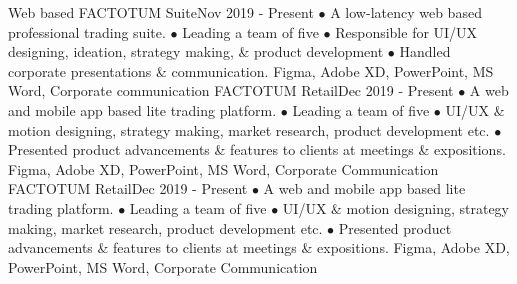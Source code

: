 %
%
%

\begin{projects}
  \project
    {Web based FACTOTUM Suite}{Nov 2019 - Present}
    {}
    {$\bullet$ A low-latency web based professional trading suite. $\bullet$ Leading a team of five $\bullet$ Responsible for UI/UX designing, ideation, strategy making, \& product development $\bullet$ Handled corporate presentations \& communication.}
    {Figma, Adobe XD, PowerPoint, MS Word, Corporate communication}
  \project
    {FACTOTUM Retail}{Dec 2019 - Present}
    { }
    {$\bullet$ A web and mobile app based lite trading platform. $\bullet$ Leading a team of five $\bullet$ UI/UX \& motion designing, strategy making, market research, product development etc. $\bullet$ Presented product advancements \& features to clients at meetings \& expositions.}
    {Figma, Adobe XD, PowerPoint, MS Word, Corporate Communication}
    \project
    {FACTOTUM Retail}{Dec 2019 - Present}
    { }
    {$\bullet$ A web and mobile app based lite trading platform. $\bullet$ Leading a team of five $\bullet$ UI/UX \& motion designing, strategy making, market research, product development etc. $\bullet$ Presented product advancements \& features to clients at meetings \& expositions.}
    {Figma, Adobe XD, PowerPoint, MS Word, Corporate Communication}
    

\end{projects}
